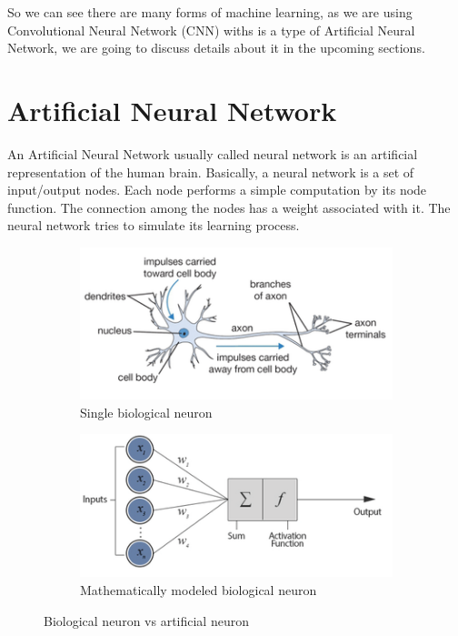 So we can see there are many forms of machine learning, as we are using Convolutional Neural Network (CNN) withs is a type of Artificial Neural Network, we are going to discuss details about it in the upcoming sections.





\section{Artificial Neural Network}

An Artificial Neural Network usually called neural network is an artificial representation of the human brain. Basically, a neural network is a set of input/output nodes. Each node performs a simple computation by its node function. The connection among the nodes has a weight associated with it. The neural network tries to simulate its learning process.




\begin{figure}[h!]
  \centering
  \begin{subfigure}[b]{0.5\linewidth}
    \includegraphics[width=\linewidth]{figures/bgn.png}
    \caption{Single biological neuron}
  \end{subfigure}
\quad
\begin{subfigure}[b]{0.5\linewidth}
    \includegraphics[width=\linewidth]{figures/ann.png}
    \caption{Mathematically modeled biological neuron}
  \end{subfigure}
 \caption{Biological neuron vs artificial neuron}
  \label{fig:bgnVSann}
\end{figure}

